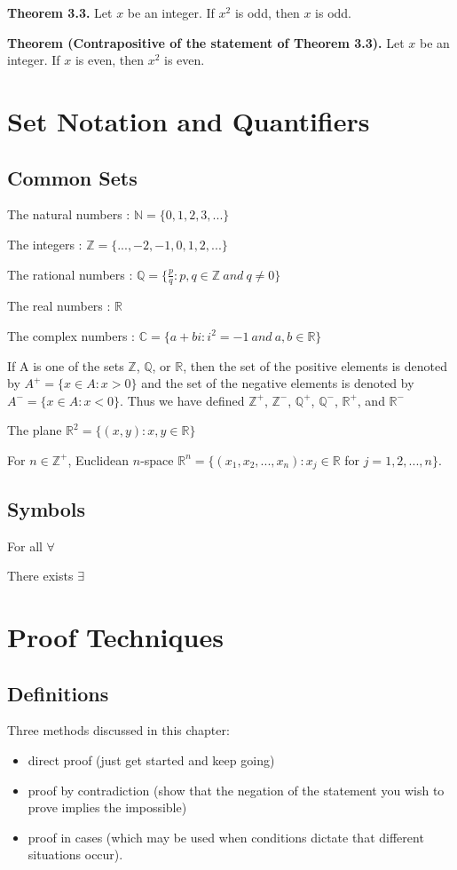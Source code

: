 \documentclass{article}
\begin{document}
\textbf{Theorem 3.3.} Let $x$ be an integer. If $x^2$ is odd, then $x$ is odd.

\textbf{Theorem (Contrapositive of the statement of Theorem 3.3).} Let $x$ be an integer. If $x$ is even, then $x^2$ is even.


\pagebreak
\section{Set Notation and Quantifiers}
\subsection{Common Sets}
The natural numbers : $\mathbb{N} = \{0,1,2,3,...\}$

The integers : $\mathbb{Z} = \{...,-2,-1,0,1,2,...\}$

The rational numbers : $\mathbb{Q} = \{\frac{p}{q} : p,q \in \mathbb{Z}\ and\ q \neq 0 \}$

The real numbers : $\mathbb{R}$

The complex numbers : $\mathbb{C} = \{a + bi : i^2 = -1 \ and \ a,b \in \mathbb{R}\}$

If A is one of the sets $\mathbb{Z}$, $\mathbb{Q}$, or $\mathbb{R}$, then the set of the positive elements is denoted by $A^+ = \{x \in A : x > 0 \}$ and the set of the negative elements is denoted by $A^- = \{x \in A : x < 0 \}$. Thus we have defined $\mathbb{Z}^+$, $\mathbb{Z}^-$, $\mathbb{Q}^+$, $\mathbb{Q}^-$, $\mathbb{R}^+$, and $\mathbb{R}^-$

The plane $\mathbb{R}^2 = \{(x,y) : x,y \in \mathbb{R} \}$

For $n \in \mathbb{Z}^+$, Euclidean $n$-space 
	$\mathbb{R}^n = \{(x_{1},x_{2},...,x_{n}) : x_{j} \in \mathbb{R}$ for $j=1,2,...,n \}$.
	
\subsection{Symbols}
For all $\forall$

There exists $\exists$


\pagebreak
\section{Proof Techniques}
\subsection{Definitions}
Three methods discussed in this chapter:
\begin{itemize}
	\item direct proof (just get started and keep going)
	\item proof by contradiction (show that the negation of the statement you wish to prove implies the impossible)
	\item proof in cases (which may be used when conditions dictate that different situations occur).
\end{itemize}
\end{document}
